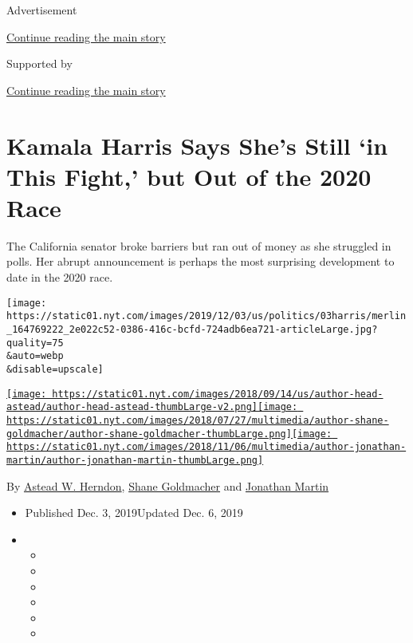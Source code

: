 Advertisement

\protect\hyperlink{after-top}{Continue reading the main story}

Supported by

\protect\hyperlink{after-sponsor}{Continue reading the main story}

\hypertarget{kamala-harris-says-shes-still-in-this-fight-but-out-of-the-2020-race}{%
\section{Kamala Harris Says She's Still `in This Fight,' but Out of the
2020
Race}\label{kamala-harris-says-shes-still-in-this-fight-but-out-of-the-2020-race}}

The California senator broke barriers but ran out of money as she
struggled in polls. Her abrupt announcement is perhaps the most
surprising development to date in the 2020 race.

\texttt{[image: https://static01.nyt.com/images/2019/12/03/us/politics/03harris/merlin\_164769222\_2e022c52-0386-416c-bcfd-724adb6ea721-articleLarge.jpg?quality=75\\\&auto=webp\\\&disable=upscale]}

\href{https://www.nytimes.com/by/astead-w-herndon}{\texttt{[image: https://static01.nyt.com/images/2018/09/14/us/author-head-astead/author-head-astead-thumbLarge-v2.png]}}\href{https://www.nytimes.com/by/shane-goldmacher}{\texttt{[image: https://static01.nyt.com/images/2018/07/27/multimedia/author-shane-goldmacher/author-shane-goldmacher-thumbLarge.png]}}\href{https://www.nytimes.com/by/jonathan-martin}{\texttt{[image: https://static01.nyt.com/images/2018/11/06/multimedia/author-jonathan-martin/author-jonathan-martin-thumbLarge.png]}}

By \href{https://www.nytimes.com/by/astead-w-herndon}{Astead W.
Herndon}, \href{https://www.nytimes.com/by/shane-goldmacher}{Shane
Goldmacher} and
\href{https://www.nytimes.com/by/jonathan-martin}{Jonathan Martin}

\begin{itemize}
\item
  Published Dec. 3, 2019Updated Dec. 6, 2019
\item
  \begin{itemize}
  \item
  \item
  \item
  \item
  \item
  \item
  \end{itemize}
\end{itemize}


